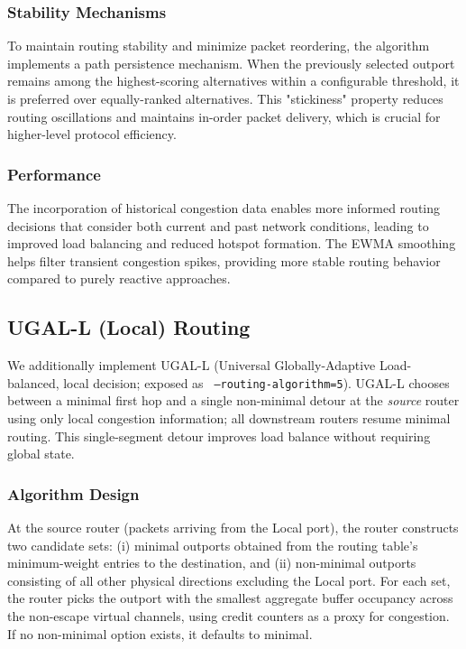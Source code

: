 \documentclass[11pt]{article}
\begin{document}
\subsubsection{Stability Mechanisms}
To maintain routing stability and minimize packet reordering, the algorithm implements a path persistence mechanism. When the previously selected outport remains among the highest-scoring alternatives within a configurable threshold, it is preferred over equally-ranked alternatives. This "stickiness" property reduces routing oscillations and maintains in-order packet delivery, which is crucial for higher-level protocol efficiency.

\subsubsection{Performance}
The incorporation of historical congestion data enables more informed routing decisions that consider both current and past network conditions, leading to improved load balancing and reduced hotspot formation. The EWMA smoothing helps filter transient congestion spikes, providing more stable routing behavior compared to purely reactive approaches.

\subsection{UGAL-L (Local) Routing}

We additionally implement UGAL-L (Universal Globally-Adaptive Load-balanced, local decision; exposed as \texttt{\,--routing-algorithm=5}). UGAL-L chooses between a minimal first hop and a single non-minimal detour at the \emph{source} router using only local congestion information; all downstream routers resume minimal routing. This single-segment detour improves load balance without requiring global state.

\subsubsection{Algorithm Design}
At the source router (packets arriving from the Local port), the router constructs two candidate sets: (i) minimal outports obtained from the routing table's minimum-weight entries to the destination, and (ii) non-minimal outports consisting of all other physical directions excluding the Local port. For each set, the router picks the outport with the smallest aggregate buffer occupancy across the non-escape virtual channels, using credit counters as a proxy for congestion. If no non-minimal option exists, it defaults to minimal.
\end{document}

